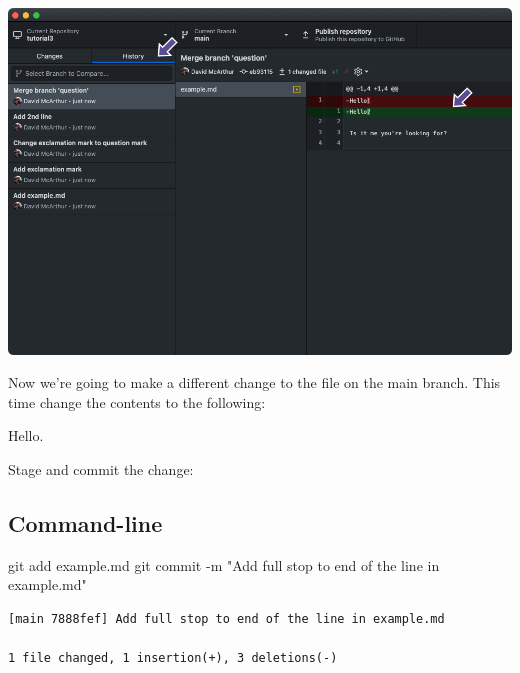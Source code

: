 \documentclass[
  letterpaper,
  DIV=11,
  numbers=noendperiod]{scrartcl}
\newenvironment{Shaded}{\begin{snugshade}}{\end{snugshade}}
\newcommand{\AttributeTok}[1]{\textcolor[rgb]{0.40,0.45,0.13}{#1}}
\newcommand{\FunctionTok}[1]{\textcolor[rgb]{0.28,0.35,0.67}{#1}}
\newcommand{\NormalTok}[1]{\textcolor[rgb]{0.00,0.23,0.31}{#1}}
\newcommand{\StringTok}[1]{\textcolor[rgb]{0.13,0.47,0.30}{#1}}
\begin{document}
\includegraphics{images/image49.png}

Now we're going to make a different change to the file on the main
branch. This time change the contents to the following:

\begin{tcolorbox}[enhanced jigsaw, opacitybacktitle=0.6, arc=.35mm, toprule=.15mm, leftrule=.75mm, colbacktitle=quarto-callout-note-color!10!white, bottomrule=.15mm, rightrule=.15mm, opacityback=0, title=\textcolor{quarto-callout-note-color}{\faInfo}\hspace{0.5em}{example.md}, toptitle=1mm, breakable, left=2mm, colback=white, titlerule=0mm, bottomtitle=1mm, coltitle=black, colframe=quarto-callout-note-color-frame]

Hello.

\end{tcolorbox}

Stage and commit the change:

\subsection{Command-line}

\begin{Shaded}
\begin{Highlighting}[]
\FunctionTok{git}\NormalTok{ add example.md}
\FunctionTok{git}\NormalTok{ commit }\AttributeTok{{-}m} \StringTok{"Add full stop to end of the line in example.md"}
\end{Highlighting}
\end{Shaded}

\begin{verbatim}
[main 7888fef] Add full stop to end of the line in example.md

1 file changed, 1 insertion(+), 3 deletions(-)
\end{verbatim}
\end{document}

